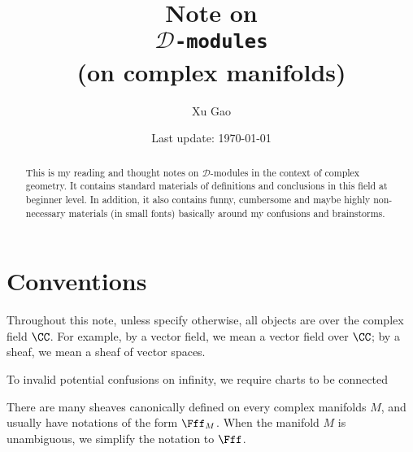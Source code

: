
%
%

%
%
\title{Note on\\ \texttt{\Huge $\mathscr{D}$-modules}\\ (on complex manifolds)}
\author{Xu Gao}
\date{
	Last update: \today
}


\maketitle
\begin{abstract}
This is my reading and thought notes on $\mathscr{D}$-modules 
in the context of complex geometry. 
It contains standard materials of definitions and conclusions in this field 
at beginner level. 
In addition, it also contains funny, cumbersome and maybe highly non-necessary 
materials (in small fonts) basically around my confusions and brainstorms.
\end{abstract}
\tableofcontents
\clearpage

\section*{Conventions}
%

Throughout this note, unless specify otherwise, 
all objects are over the complex field $\CC$. 
For example, by a vector field, we mean a vector field over $\CC$; 
by a sheaf, we mean a sheaf of vector spaces.

To invalid potential confusions on infinity, 
we require charts to be connected

There are many sheaves canonically defined on every complex manifolds $M$, 
and usually have notations of the form $\Fff_M$. 
When the manifold $M$ is unambiguous, we simplify the notation to $\Fff$.

